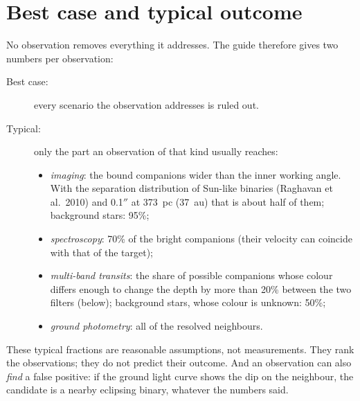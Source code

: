 \section{Best case and typical outcome}
No observation removes everything it addresses. The guide therefore gives two
numbers per observation:
\begin{description}
\item[Best case:] every scenario the observation addresses is ruled out.
\item[Typical:] only the part an observation of that kind usually reaches:
\begin{itemize}
\item \emph{imaging}: the bound companions wider than the inner working angle.
With the separation distribution of Sun-like binaries (Raghavan et al.\ 2010)
and 0.1$''$ at 373~pc (37~au) that is about half of them; background stars:
95\%;
\item \emph{spectroscopy}: 70\% of the bright companions (their velocity can
coincide with that of the target);
\item \emph{multi-band transits}: the share of possible companions whose
colour differs enough to change the depth by more than 20\% between the two
filters (below); background stars, whose colour is unknown: 50\%;
\item \emph{ground photometry}: all of the resolved neighbours.
\end{itemize}
\end{description}
These typical fractions are reasonable assumptions, not measurements. They
rank the observations; they do not predict their outcome. And an observation
can also \emph{find} a false positive: if the ground light curve shows the dip
on the neighbour, the candidate is a nearby eclipsing binary, whatever the
numbers said.

